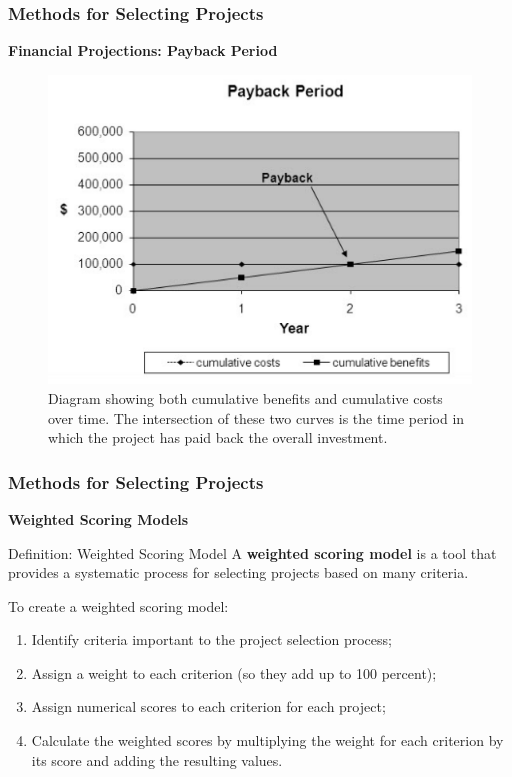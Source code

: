\documentclass{beamer}
\begin{document}
\begin{frame}
\frametitle{Methods for Selecting Projects}
\textbf{Financial Projections: Payback Period}\\
\begin{figure}
\includegraphics[scale=0.5]{payback}
\caption{Diagram showing both cumulative benefits and cumulative costs over time. The intersection of these two curves is the time period in which the project has paid back the overall investment.}
\end{figure}
\end{frame}
\begin{frame}
\frametitle{Methods for Selecting Projects}
\textbf{Weighted Scoring Models}\\
\vspace{0.5cm}
\begin{block}{Definition: Weighted Scoring Model}
A \textbf{weighted scoring model} is a tool that provides a systematic process for selecting projects based on many criteria.
\end{block}
\vspace{0.5cm}
To create a weighted scoring model:
\begin{enumerate}
\item Identify criteria important to the project selection process;
\item Assign a weight to each criterion (so they add up to 100 percent);
\item Assign numerical scores to each criterion for each project;
\item Calculate the weighted scores by multiplying the weight for each criterion by its score and adding the resulting values.
\end{enumerate}
\end{frame}
\end{document}
